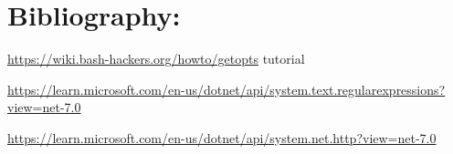 \documentclass[10pt]{article}
\begin{document}
\section{Bibliography:}
\href{https://wiki.bash-hackers.org/howto/getopts}{https://wiki.bash-hackers.org/howto/getopts} tutorial

\href{https://learn.microsoft.com/en-us/dotnet/api/system.text.regularexpressions?view=net-7.0}{https://learn.microsoft.com/en-us/dotnet/api/system.text.regularexpressions?view=net-7.0}

\href{https://learn.microsoft.com/en-us/dotnet/api/system.net.http?view=net-7.0}{https://learn.microsoft.com/en-us/dotnet/api/system.net.http?view=net-7.0}
\end{document}

